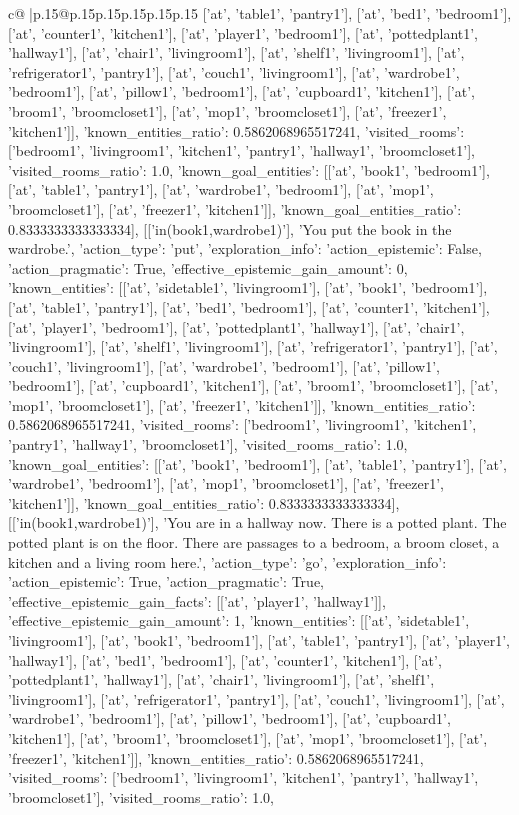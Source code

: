 \documentclass{article}
\begin{document}
{\begin{supertabular}{c@{$\;$}|p{.15\linewidth}@{}p{.15\linewidth}p{.15\linewidth}p{.15\linewidth}p{.15\linewidth}p{.15\linewidth}}
{{{['at', 'table1', 'pantry1'], ['at', 'bed1', 'bedroom1'], ['at', 'counter1', 'kitchen1'], ['at', 'player1', 'bedroom1'], ['at', 'pottedplant1', 'hallway1'], ['at', 'chair1', 'livingroom1'], ['at', 'shelf1', 'livingroom1'], ['at', 'refrigerator1', 'pantry1'], ['at', 'couch1', 'livingroom1'], ['at', 'wardrobe1', 'bedroom1'], ['at', 'pillow1', 'bedroom1'], ['at', 'cupboard1', 'kitchen1'], ['at', 'broom1', 'broomcloset1'], ['at', 'mop1', 'broomcloset1'], ['at', 'freezer1', 'kitchen1']], 'known_entities_ratio': 0.5862068965517241, 'visited_rooms': ['bedroom1', 'livingroom1', 'kitchen1', 'pantry1', 'hallway1', 'broomcloset1'], 'visited_rooms_ratio': 1.0, 'known_goal_entities': [['at', 'book1', 'bedroom1'], ['at', 'table1', 'pantry1'], ['at', 'wardrobe1', 'bedroom1'], ['at', 'mop1', 'broomcloset1'], ['at', 'freezer1', 'kitchen1']], 'known_goal_entities_ratio': 0.8333333333333334}}], [['in(book1,wardrobe1)'], 'You put the book in the wardrobe.', {'action_type': 'put', 'exploration_info': {'action_epistemic': False, 'action_pragmatic': True, 'effective_epistemic_gain_amount': 0, 'known_entities': [['at', 'sidetable1', 'livingroom1'], ['at', 'book1', 'bedroom1'], ['at', 'table1', 'pantry1'], ['at', 'bed1', 'bedroom1'], ['at', 'counter1', 'kitchen1'], ['at', 'player1', 'bedroom1'], ['at', 'pottedplant1', 'hallway1'], ['at', 'chair1', 'livingroom1'], ['at', 'shelf1', 'livingroom1'], ['at', 'refrigerator1', 'pantry1'], ['at', 'couch1', 'livingroom1'], ['at', 'wardrobe1', 'bedroom1'], ['at', 'pillow1', 'bedroom1'], ['at', 'cupboard1', 'kitchen1'], ['at', 'broom1', 'broomcloset1'], ['at', 'mop1', 'broomcloset1'], ['at', 'freezer1', 'kitchen1']], 'known_entities_ratio': 0.5862068965517241, 'visited_rooms': ['bedroom1', 'livingroom1', 'kitchen1', 'pantry1', 'hallway1', 'broomcloset1'], 'visited_rooms_ratio': 1.0, 'known_goal_entities': [['at', 'book1', 'bedroom1'], ['at', 'table1', 'pantry1'], ['at', 'wardrobe1', 'bedroom1'], ['at', 'mop1', 'broomcloset1'], ['at', 'freezer1', 'kitchen1']], 'known_goal_entities_ratio': 0.8333333333333334}}], [['in(book1,wardrobe1)'], 'You are in a hallway now. There is a potted plant. The potted plant is on the floor. There are passages to a bedroom, a broom closet, a kitchen and a living room here.', {'action_type': 'go', 'exploration_info': {'action_epistemic': True, 'action_pragmatic': True, 'effective_epistemic_gain_facts': [['at', 'player1', 'hallway1']], 'effective_epistemic_gain_amount': 1, 'known_entities': [['at', 'sidetable1', 'livingroom1'], ['at', 'book1', 'bedroom1'], ['at', 'table1', 'pantry1'], ['at', 'player1', 'hallway1'], ['at', 'bed1', 'bedroom1'], ['at', 'counter1', 'kitchen1'], ['at', 'pottedplant1', 'hallway1'], ['at', 'chair1', 'livingroom1'], ['at', 'shelf1', 'livingroom1'], ['at', 'refrigerator1', 'pantry1'], ['at', 'couch1', 'livingroom1'], ['at', 'wardrobe1', 'bedroom1'], ['at', 'pillow1', 'bedroom1'], ['at', 'cupboard1', 'kitchen1'], ['at', 'broom1', 'broomcloset1'], ['at', 'mop1', 'broomcloset1'], ['at', 'freezer1', 'kitchen1']], 'known_entities_ratio': 0.5862068965517241, 'visited_rooms': ['bedroom1', 'livingroom1', 'kitchen1', 'pantry1', 'hallway1', 'broomcloset1'], 'visited_rooms_ratio': 1.0, }}}
\end{supertabular}}
\end{document}
